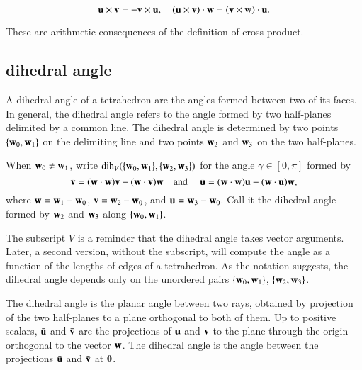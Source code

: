 \begin{lemma}[]
\begin{displaymath}
{\mathbf u}\times {\mathbf v} = -{\mathbf v}\times {\mathbf u},\quad
({\mathbf u}\times {\mathbf v})\cdot {\mathbf w} = ({\mathbf v}\times {\mathbf w})\cdot {\mathbf u}.
\end{displaymath}
\end{lemma}

\begin{proved}
These are arithmetic consequences of the definition of cross product.
\swallowed\end{proved}



\subsection{dihedral angle}

A dihedral angle of a tetrahedron are the angles formed between two of
its faces. In general, the dihedral angle refers to the angle formed
by two half-planes delimited by a common line.  The dihedral angle is
determined by two points $\{{\mathbf w}_0,{\mathbf w}_1\}$ on the delimiting line and
two points ${\mathbf w}_2$ and ${\mathbf w}_3$ on the two half-planes.
%
%
%
%
%

\begin{definition}\label{def:dih} When ${\mathbf w}_0\ne {\mathbf w}_1$,
  write $\operatorname{dih}_V(\{{\mathbf w}_0,{\mathbf w}_1\},\{{\mathbf w}_2,{\mathbf w}_3\})$ for the angle
  $\gamma\in[0,\pi]$ formed by
\begin{displaymath}
\bar {{\mathbf v}} = ({\mathbf w}\cdot {\mathbf w}) {\mathbf v} - ({\mathbf w}\cdot {\mathbf v}) {\mathbf w}\quad\text{and }\quad \bar {{\mathbf u}} =
({\mathbf w}\cdot {\mathbf w}) {\mathbf u} - ({\mathbf w}\cdot {\mathbf u}) {\mathbf w},
\end{displaymath}
where ${\mathbf w}={\mathbf w}_1-{\mathbf w}_0$, ${\mathbf v} = {\mathbf w}_2-{\mathbf w}_0$,  and ${\mathbf u}={\mathbf w}_3-{\mathbf w}_0$.  Call it
the dihedral angle formed by ${\mathbf w}_2$ and ${\mathbf w}_3$ along $\{{\mathbf w}_0,{\mathbf w}_1\}$.
%
%
\end{definition}
The subscript $V$ is a reminder 
that the dihedral angle takes vector arguments.
Later, a second version, without the subscript, will
compute the angle as a function of the lengths of edges of a 
tetrahedron.
%
%
As the notation suggests, the dihedral angle depends only
on the unordered pairs $\{{\mathbf w}_0,{\mathbf w}_1\}$, $\{{\mathbf w}_2,{\mathbf w}_3\}$.

The dihedral angle is the planar angle between two rays, obtained by
projection of the two half-planes to a plane orthogonal to both of
them.  Up to positive scalars, $\bar {{\mathbf u}}$ and $\bar {{\mathbf v}}$ are the
projections of ${\mathbf u}$ and ${\mathbf v}$ to the plane through the origin
orthogonal to the vector ${\mathbf w}$.  The dihedral angle is the angle
between the projections $\bar {{\mathbf u}}$ and $\bar {{\mathbf v}}$ at ${\mathbf 0}$.

